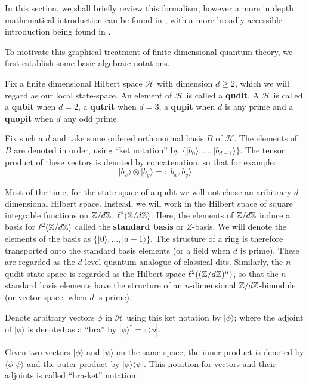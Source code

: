 In this section, we shall briefly review this formalism; however a more in depth mathematical introduction can be found in \cite{heunen}, with a more broadly accessible introduction being found in \cite{pqp}.


To motivate this graphical treatment of finite dimensional quantum theory, we first establish some basic algebraic notations.


Fix a finite dimensional Hilbert space $\mathcal H$ with dimension $d\geq 2$, which we will regard as our local state-space. An element of $\mathcal H$ is called a {\bf qudit}.  A $\mathcal H$ is called a {\bf qubit} when $d=2$, a {\bf qutrit} when $d=3$, a {\bf qupit} when $d$ is any prime and a {\bf quopit} when $d$ any odd prime.

Fix such a $d$ and take some ordered orthonormal basis $B$ of $\mathcal H$.  The elements of $B$ are denoted in order, using ``ket notation'' by $\{| b_0\rangle , \ldots, |b_{d-1}\rangle \}$.
The tensor product of these vectors is denoted by concatenation, so that for example:
$$
| b_x \rangle \otimes | b_y\rangle =: |b_x,b_y \rangle  
$$


Most of the time,  for the state space of a qudit we will not chose an aribitrary $d$-dimensional Hilbert space.  Instead, we will work in the Hilbert space of square integrable functions on $\mathbb{Z}/d\mathbb{Z}$, $\ell^2(\mathbb{Z}/d\mathbb{Z})$.  Here, the elements of $\mathbb{Z}/d\mathbb{Z}$ induce a basis for  $\ell^2(\mathbb{Z}/d\mathbb{Z})$ called the {\bf standard basis} or $Z$-basis.  We will denote the elements of the basis  as  $\{| 0\rangle , \ldots, |d-1\rangle \}$.  The structure of a ring is therefore transported onto the standard basis elements (or a field when $d$ is prime).  These are regarded as the $d$-level quantum analogue of classical dits.    Similarly, the $n$-qudit state space is regarded as the Hilbert space $\ell^2((\mathbb{Z}/d\mathbb{Z})^n)$, so that the $n$-standard basis elements have the structure of an $n$-dimensional $\mathbb{Z}/d\mathbb{Z}$-bimodule (or vector space, when $d$ is prime).

Denote arbitrary vectors $\phi$ in $\mathcal H$ using this ket notation by $|\phi \rangle$; where the adjoint of $|\phi \rangle$ is denoted as a ``bra''  by $|\phi \rangle^\dag =: \langle \phi |$. 

Given two vectors $|\phi \rangle$ and $| \psi \rangle$ on the same space, the inner product is denoted by $\langle \phi | \psi \rangle$ and the outer product by $|\phi \rangle\langle \psi|$.  This notation for vectors and their adjoints is called ``bra-ket'' notation.


